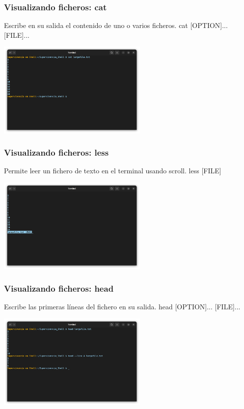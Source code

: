 \documentclass[10pt]{beamer}
\begin{document}
	\begin{frame}
		\frametitle{Visualizando ficheros: cat}
		\begin{alertblock}{Escribe en su salida el contenido de uno o varios ficheros.}
			cat [OPTION]... [FILE]...
		\end{alertblock}
		\begin{center}
			\includegraphics[width=0.55\textwidth]{cat}
		\end{center}
	\end{frame}	
	
	\begin{frame}
		\frametitle{Visualizando ficheros: less}
		\begin{alertblock}{Permite leer un fichero de texto en el terminal usando scroll.}
			less [FILE]
		\end{alertblock}
		\begin{center}
			\includegraphics[width=0.55\textwidth]{less}
		\end{center}
	\end{frame}
		
	\begin{frame}
		\frametitle{Visualizando ficheros: head}
		\begin{alertblock}{Escribe las primeras líneas del fichero en su salida.}
			head [OPTION]... [FILE]...
		\end{alertblock}
		\begin{center}
			\includegraphics[width=0.55\textwidth]{head}
		\end{center}
	\end{frame}	
	
\end{document}
